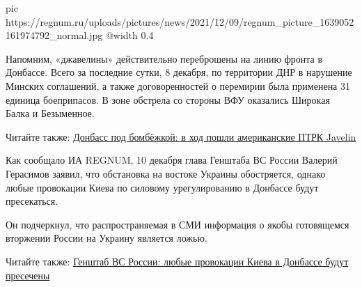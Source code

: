 \ifcmt
  pic https://regnum.ru/uploads/pictures/news/2021/12/09/regnum_picture_1639052161974792_normal.jpg
  @width 0.4
\fi

Напомним, «джавелины» действительно переброшены на линию фронта в Донбассе.
Всего за последние сутки, 8 декабря, по территории ДНР в нарушение Минских
соглашений, а также договоренностей о перемирии была применена 31 единица
боеприпасов. В зоне обстрела со стороны ВФУ оказались Широкая Балка и
Безыменное.

Читайте также: \href{https://regnum.ru/news/accidents/3446078.html}{%
Донбасс под бомбёжкой: в ход пошли американские ПТРК Javelin}

Как сообщало ИА REGNUM, 10 декабря глава Генштаба ВС России Валерий Герасимов
заявил, что обстановка на востоке Украины обостряется, однако любые провокации
Киева по силовому урегулированию в Донбассе будут пресекаться.

Он подчеркнул, что распространяемая в СМИ информация о якобы готовящемся
вторжении России на Украину является ложью.

Читайте также: \href{https://regnum.ru/news/polit/3446331.html}{%
Генштаб ВС России: любые провокации Киева в Донбассе будут%
пресечены}


